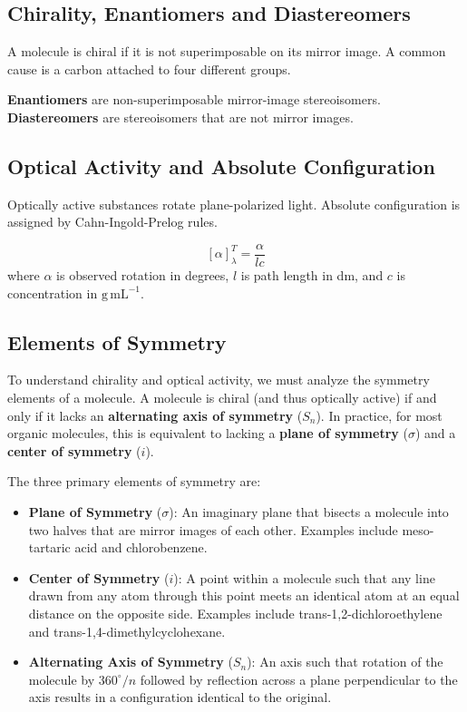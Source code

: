 \documentclass[12pt,a4paper]{article}
\begin{document}
\subsection{Chirality, Enantiomers and Diastereomers}
A molecule is chiral if it is not superimposable on its mirror image. A common cause is a carbon attached to four different groups.

\begin{tcolorbox}[defbox]
\textbf{Enantiomers} are non-superimposable mirror-image stereoisomers. \textbf{Diastereomers} are stereoisomers that are not mirror images.
\end{tcolorbox}

\subsection{Optical Activity and Absolute Configuration}
Optically active substances rotate plane-polarized light. Absolute configuration is assigned by Cahn-Ingold-Prelog rules.

\begin{tcolorbox}[formulabox, title={Specific Rotation}]
\[
[\alpha]_{\lambda}^{T}=\frac{\alpha}{lc}
\]
where $\alpha$ is observed rotation in degrees, $l$ is path length in dm, and $c$ is concentration in $\mathrm{g\,mL^{-1}}$.
\end{tcolorbox}

\subsection{Elements of Symmetry}
To understand chirality and optical activity, we must analyze the symmetry elements of a molecule. A molecule is chiral (and thus optically active) if and only if it lacks an \textbf{alternating axis of symmetry} ($S_n$). In practice, for most organic molecules, this is equivalent to lacking a \textbf{plane of symmetry} ($\sigma$) and a \textbf{center of symmetry} ($i$).

\begin{tcolorbox}[defbox, title={Symmetry Elements}]
The three primary elements of symmetry are:
\begin{itemize}[leftmargin=*, itemsep=3pt, topsep=2pt]
  \item \textbf{Plane of Symmetry} ($\sigma$): An imaginary plane that bisects a molecule into two halves that are mirror images of each other. Examples include meso-tartaric acid and chlorobenzene.
  \item \textbf{Center of Symmetry} ($i$): A point within a molecule such that any line drawn from any atom through this point meets an identical atom at an equal distance on the opposite side. Examples include trans-1,2-dichloroethylene and trans-1,4-dimethylcyclohexane.
  \item \textbf{Alternating Axis of Symmetry} ($S_n$): An axis such that rotation of the molecule by $360^\circ/n$ followed by reflection across a plane perpendicular to the axis results in a configuration identical to the original.
\end{itemize}
\end{tcolorbox}
\end{document}
